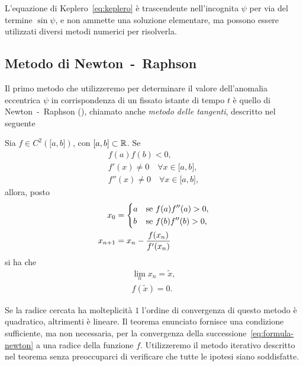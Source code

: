 L'equazione di Keplero~\eqref{eq:keplero} è trascendente nell'incognita $\psi$
per via del termine $\sin\psi$, e non ammette una soluzione elementare, ma
possono essere utilizzati diversi metodi numerici per risolverla.

\subsection{Metodo di Newton~-~Raphson}
\label{sec:newton}

Il primo metodo che utilizzeremo per determinare il valore dell'anomalia
eccentrica $\psi$ in corrispondenza di un fissato istante di tempo $t$ è quello
di Newton~-~Raphson (\textcite{brugnano:calcolo-numerico}), chiamato anche
\emph{metodo delle tangenti}, descritto nel seguente
\begin{teorema}
  Sia $f\in C^2(\mathopen{[}a,b\mathclose{]})$, con
  $\mathopen{[}a,b\mathclose{]}\subset\mathbb{R}$. Se
  \begin{subequations}
    \begin{gather}
      f(a)f(b) <0, \label{eq:esistenza-zero}\\
      f'(x) \neq 0 \quad \forall x \in \mathopen{[}a,b\mathclose{]},\\
      f''(x) \neq 0 \quad \forall x \in \mathopen{[}a,b\mathclose{]},
    \end{gather}
  \end{subequations}
  allora, posto
  \begin{subequations}
    \begin{align}
      x_0 &=
      \begin{dcases}
        a & \text{se $f(a)f''(a)>0$,}\\
        b & \text{se $f(b)f''(b)>0$,}
      \end{dcases}\\
      x_{n+1} &= x_n - \frac{f(x_n)}{f'(x_n)} \label{eq:formula-newton}
    \end{align}
  \end{subequations}
  si ha che
  \begin{subequations}
    \begin{gather}
      \lim_n x_n = \tilde{x},\\
      f(\tilde{x}) = 0.
    \end{gather}
  \end{subequations}
\end{teorema}
Se la radice cercata ha molteplicità $1$ l'ordine di convergenza di questo
metodo è quadratico, altrimenti è lineare. Il teorema enunciato fornisce una
condizione sufficiente, ma non necessaria, per la convergenza della
successione~\eqref{eq:formula-newton} a una radice della funzione
$f$. Utilizzeremo il metodo iterativo descritto nel teorema senza preoccuparci
di verificare che tutte le ipotesi siano soddisfatte.

